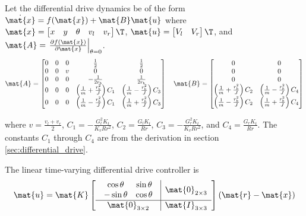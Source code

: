 \begin{theorem}
  \label{thm:linear_time-varying_diff_drive_controller}

  Let the differential drive dynamics be of the form
  $\dot{\mat{x}} = f(\mat{x}) + \mat{B}\mat{u}$ where
  $\mat{x} = \begin{bmatrix}x & y & \theta & v_l & v_r\end{bmatrix}\T$,
  $\mat{u} = \begin{bmatrix}V_l & V_r\end{bmatrix}\T$, and
  $\mat{A} = \left.\frac{\partial f(\mat{x})}{\partial\mat{x}}\right|_{\theta = 0}$.
  \begin{equation}
    \mat{A} =
    \begin{bmatrix}
      0 & 0 & 0 & \frac{1}{2} & \frac{1}{2} \\
      0 & 0 & v & 0 & 0 \\
      0 & 0 & 0 & -\frac{1}{2r_b} & \frac{1}{2r_b} \\
      0 & 0 & 0 & \left(\frac{1}{m} + \frac{r_b^2}{J}\right) C_1 &
        \left(\frac{1}{m} - \frac{r_b^2}{J}\right) C_3 \\
      0 & 0 & 0 & \left(\frac{1}{m} - \frac{r_b^2}{J}\right) C_1 &
        \left(\frac{1}{m} + \frac{r_b^2}{J}\right) C_3
    \end{bmatrix}
    \quad
    \mat{B} =
    \begin{bmatrix}
      0 & 0 \\
      0 & 0 \\
      0 & 0 \\
      \left(\frac{1}{m} + \frac{r_b^2}{J}\right) C_2 &
      \left(\frac{1}{m} - \frac{r_b^2}{J}\right) C_4 \\
      \left(\frac{1}{m} - \frac{r_b^2}{J}\right) C_2 &
      \left(\frac{1}{m} + \frac{r_b^2}{J}\right) C_4
    \end{bmatrix}
  \end{equation}

  where $v = \frac{v_l + v_r}{2}$, $C_1 = -\frac{G_l^2 K_t}{K_v R r^2}$,
  $C_2 = \frac{G_l K_t}{Rr}$, $C_3 = -\frac{G_r^2 K_t}{K_v R r^2}$, and
  $C_4 = \frac{G_r K_t}{Rr}$. The constants $C_1$ through $C_4$ are from the
  derivation in section \ref{sec:differential_drive}.

  The linear time-varying differential drive controller is
  \begin{equation}
    \mat{u} = \mat{K}
    \left[
      \begin{array}{c|c}
        \begin{array}{cc}
          \cos\theta & \sin\theta \\
          -\sin\theta & \cos\theta
        \end{array} & \mat{0}_{2 \times 3} \\
        \hline
        \mat{0}_{3 \times 2} & \mat{I}_{3 \times 3}
      \end{array}
    \right]
    (\mat{r} - \mat{x})
  \end{equation}


\end{theorem}
